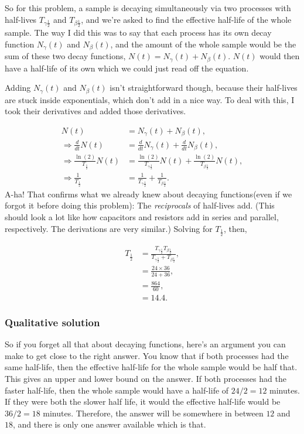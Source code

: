 \documentclass[11pt]{paper}
\begin{document}
So for this problem, a sample is decaying simultaneously via two processes with half-lives $T_{\gamma\frac{1}{2}}$ and $T_{\beta\frac{1}{2}}$, and we're asked to find the effective half-life of the whole sample.  The way I did this was to say that each process has its own decay function $N_\gamma(t)$ and $N_\beta(t)$, and the amount of the whole sample would be the sum of these two decay functions, $N(t) = N_\gamma(t) + N_\beta(t)$.  $N(t)$ would then have a half-life of its own which we could just read off the equation.

Adding $N_\gamma(t)$ and $N_\beta(t)$ isn't straightforward though, because their half-lives are stuck inside exponentials, which don't add in a nice way.  To deal with this, I took their derivatives and added those derivatives.

\begin{align}
N(t) &= N_\gamma(t) + N_\beta(t),\\
\Rightarrow\frac{d}{dt}N(t) &= \frac{d}{dt}N_\gamma(t) + \frac{d}{dt}N_\beta(t),\\
\Rightarrow\frac{\ln{\left(2\right)}}{T_{\frac{1}{2}}}N(t)&= \frac{\ln{\left({2}\right)}}{T_{\gamma\frac{1}{2}}}N(t) + \frac{\ln{\left(2\right)}}{T_{\beta\frac{1}{2}}}N(t),\\
\Rightarrow \frac{1}{T_\frac{1}{2}} &= \frac{1}{T_{\gamma\frac{1}{2}}} + \frac{1}{T_{\beta\frac{1}{2}}}.
\end{align}
A-ha! That confirms what we already knew about decaying functions(even if we forgot it before doing this problem):  The \emph{reciprocals} of half-lives add.  (This should look a lot like how capacitors and resistors add in series and parallel, respectively.  The derivations are very similar.)  Solving for $T_{\frac{1}{2}}$, then,

\begin{align}
T_{\frac{1}{2}} &= \frac{T_{\gamma\frac{1}{2}}T_{\beta\frac{1}{2}}}{T_{\gamma\frac{1}{2}}+T_{\beta\frac{1}{2}}},\\
&=\frac{24\times36}{24+36},\\
&=\frac{864}{60},\\
&=14.4.
\end{align}

\subsubsection*{Qualitative solution}
So if you forget all that about decaying functions, here's an argument you can make to get close to the right answer.  You know that if both processes had the same half-life, then the effective half-life for the whole sample would be half that.  This gives an upper and lower bound on the answer.  If both processes had the faster half-life, then the whole sample would have a half-life of $24/2 = 12$ minutes.  If they were both the slower half life, it would the effective half-life would be $36/2 = 18$ minutes.  Therefore, the answer will be somewhere in between $12$ and $18$, and there is only one answer available which is that.\\
\end{document}
